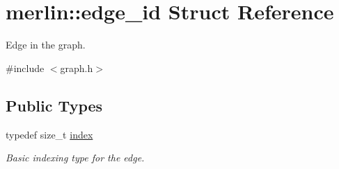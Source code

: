\hypertarget{structmerlin_1_1edge__id}{}\section{merlin\+:\+:edge\+\_\+id Struct Reference}
\label{structmerlin_1_1edge__id}


Edge in the graph.  




{\ttfamily \#include $<$graph.\+h$>$}

\subsection*{Public Types}
\begin{DoxyCompactItemize}
\item 
typedef size\+\_\+t \hyperlink{structmerlin_1_1edge__id_af57e3c1f2c2c3194d96468a5f0e7cce0}{index}\hypertarget{structmerlin_1_1edge__id_af57e3c1f2c2c3194d96468a5f0e7cce0}{}\label{structmerlin_1_1edge__id_af57e3c1f2c2c3194d96468a5f0e7cce0}

\begin{DoxyCompactList}\small\item\em Basic indexing type for the edge. \end{DoxyCompactList}\end{DoxyCompactItemize}
